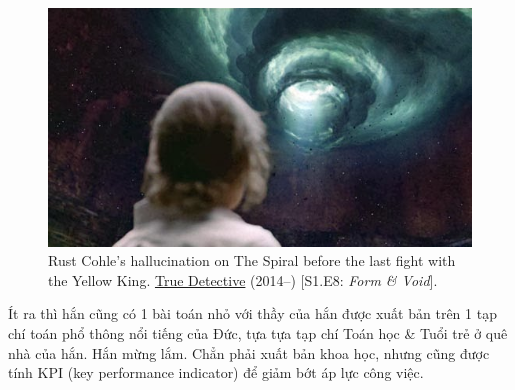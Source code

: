 \documentclass[12pt]{article}
\begin{document}
\begin{figure}[H]
	\centering
	\includegraphics[width = 15cm]{spiral}
	\caption{Rust Cohle's hallucination on The Spiral before the last fight with the Yellow King. \href{https://www.imdb.com/title/tt2356777/}{True Detective} (2014--) [S1.E8: {\it Form \& Void}].}
\end{figure}
Ít ra thì hắn cũng có 1 bài toán nhỏ với thầy của hắn được xuất bản trên 1 tạp chí toán phổ thông nổi tiếng của Đức, tựa tựa tạp chí Toán học \& Tuổi trẻ ở quê nhà của hắn. Hắn mừng lắm. Chẳn phải xuất bản khoa học, nhưng cũng được tính KPI (key performance indicator) để giảm bớt áp lực công việc.
\end{document}
